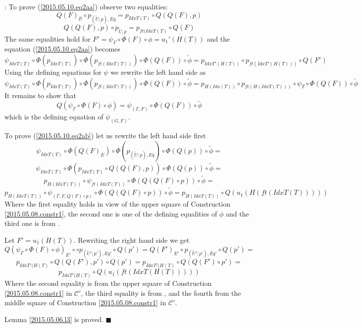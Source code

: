 \documentclass[12pt]{article}
\numberwithin{equation}{section}
\newenvironment{myproof}{{\bf Proof}:}{$\blacksquare$ \vskip 5mm }
\newcommand{\wt}{\widetilde}
\begin{document}
\begin{myproof}
To prove (\ref{2015.05.10.eq2aa}) observe two equalities:
%
$$Q(F)_E\circ p_{(\wt{U};p),Eq}=p_{IdxT(T)}\circ Q(Q(F),p)$$
%
$$Q(Q(F),p)\circ p_{\wt{U},p}=p_{ft(IdxT(T)}\circ Q(F)$$
%
The same equalities hold for $F'=\psi_{\Gamma}\circ\Phi(F)\circ
\phi=u_1'(H(T))$ and the equation (\ref{2015.05.10.eq2aa}) becomes
%
$$\psi_{IdxT(T)}\circ \Phi(p_{IdxT(T)})\circ \Phi(p_{ft(IdxT(T))})\circ
\Phi(Q(F))\circ \wt{\phi}=p_{IdxT'(H(T))}\circ p_{ft(IdxT'(H(T)))}\circ Q(F')$$
%
Using the defining equations for $\psi$ we rewrite the left hand side as
%
$$\psi_{IdxT(T)}\circ \Phi(p_{IdxT(T)})\circ \Phi(p_{ft(IdxT(T))})\circ
\Phi(Q(F))\circ \wt{\phi}=p_{H(Idx(T))}\circ p_{ft(H(IdxT(T)))}\circ
\psi_{T}\circ \Phi(Q(F))\circ \wt{\phi}$$
%
It remains to show that
%
$$Q(\psi_{\Gamma}\circ \Phi(F)\circ \phi)=\psi_{(\Gamma,F)}\circ
\Phi(Q(F))\circ \wt{\phi}$$
%
which is the defining equation of $\psi_{(G,F)}$.

To prove (\ref{2015.05.10.eq2ab}) let us rewrite the left hand side first
%
$$\psi_{IdxT(T)}\circ \Phi(Q(F)_E)\circ \Phi(p_{(\wt{U};p),Eq})\circ
\Phi(Q(p))\circ \wt{\phi}=$$$$\psi_{IdxT(T)}\circ \Phi(p_{IdxT(T)}\circ
Q(Q(F),p))\circ \Phi(Q(p))\circ\wt{\phi}=$$$$p_{H(IdxT(T))}\circ
\psi_{ft(IdxT(T))}\circ \Phi(Q(Q(F)\circ p))\circ
\wt{\phi}=$$$$p_{H(IdxT(T))}\circ \psi_{(\Gamma,F,Q(F)\circ p)}\circ
\Phi(Q(Q(F)\circ p))\circ \wt{\phi}=p_{H(IdxT(T))}\circ
Q(u_1(H(ft(IdxT(T)))))$$
%
Where the first equality holds in view of the upper square of Construction
\ref{2015.05.08.constr1}, the second one is one of the defining equalities of
$\phi$ and the third one is from \cite[Lemma 3.2]{fromunivwithPi}.

Let $F'=u_1(H(T))$. Rewriting the right hand side we get
%
$$Q(\psi_{\Gamma}\circ \Phi(F)\circ \phi)_{E'}\circ \circ
p_{(\wt{U}';p'),Eq'}\circ Q(p')=Q(F')_{E'}\circ p_{(\wt{U}';p'),Eq'}\circ
Q(p')=$$
$$p_{IdxT'(H(T)}\circ Q(Q(F'),p')\circ Q(p')=p_{IdxT'(H(T)}\circ Q(Q(F')\circ
p')=$$
$$p_{IdxT'(H(T)}\circ Q(u_1(ft(IdxT(H(T)))))$$
%
Where the second equality is from the upper square of Construction
\ref{2015.05.08.constr1} in $\mathcal C'$, the third equality is from
\cite[Lemma 3.2]{fromunivwithPi}, and the fourth from the middle square of
Construction \ref{2015.05.08.constr1} in $\mathcal C'$.

Lemma \ref{2015.05.06.l3} is proved.
\end{myproof}
\end{document}
